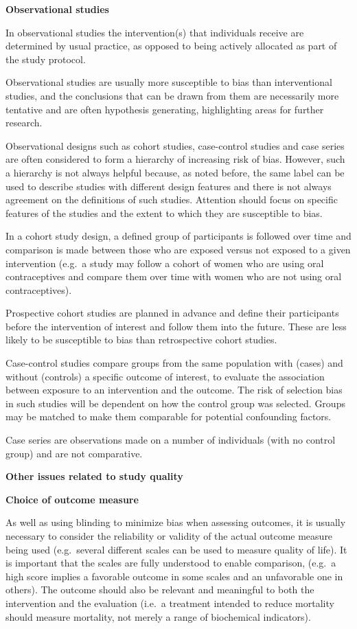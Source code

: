 \documentclass[
  11pt,
  a4paper,
  DIV=11,
  numbers=noendperiod]{scrreprt}
\begin{document}
\textbf{Observational studies}

In observational studies the intervention(s) that individuals receive
are determined by usual practice, as opposed to being actively allocated
as part of the study protocol.

Observational studies are usually more susceptible to bias than
interventional studies, and the conclusions that can be drawn from them
are necessarily more tentative and are often hypothesis generating,
highlighting areas for further research.

Observational designs such as cohort studies, case-control studies and
case series are often considered to form a hierarchy of increasing risk
of bias. However, such a hierarchy is not always helpful because, as
noted before, the same label can be used to describe studies with
different design features and there is not always agreement on the
definitions of such studies. Attention should focus on specific features
of the studies and the extent to which they are susceptible to bias.

In a cohort study design, a defined group of participants is followed
over time and comparison is made between those who are exposed versus
not exposed to a given intervention (e.g.~a study may follow a cohort of
women who are using oral contraceptives and compare them over time with
women who are not using oral contraceptives).

Prospective cohort studies are planned in advance and define their
participants before the intervention of interest and follow them into
the future. These are less likely to be susceptible to bias than
retrospective cohort studies.

Case-control studies compare groups from the same population with
(cases) and without (controls) a specific outcome of interest, to
evaluate the association between exposure to an intervention and the
outcome. The risk of selection bias in such studies will be dependent on
how the control group was selected. Groups may be matched to make them
comparable for potential confounding factors.

Case series are observations made on a number of individuals (with no
control group) and are not comparative.

\textbf{Other issues related to study quality}

\textbf{Choice of outcome measure}

As well as using blinding to minimize bias when assessing outcomes, it
is usually necessary to consider the reliability or validity of the
actual outcome measure being used (e.g.~several different scales can be
used to measure quality of life). It is important that the scales are
fully understood to enable comparison, (e.g.~a high score implies a
favorable outcome in some scales and an unfavorable one in others). The
outcome should also be relevant and meaningful to both the intervention
and the evaluation (i.e.~a treatment intended to reduce mortality should
measure mortality, not merely a range of biochemical indicators).
\end{document}
